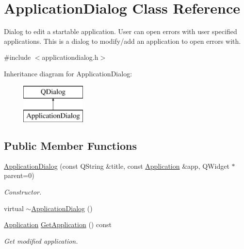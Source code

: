 \hypertarget{class_application_dialog}{\section{Application\-Dialog Class Reference}
\label{class_application_dialog}
}


Dialog to edit a startable application. User can open errors with user specified applications. This is a dialog to modify/add an application to open errors with.  




{\ttfamily \#include $<$applicationdialog.\-h$>$}

Inheritance diagram for Application\-Dialog\-:\begin{figure}[H]
\begin{center}
\leavevmode
\includegraphics[height=2.000000cm]{class_application_dialog}
\end{center}
\end{figure}
\subsection*{Public Member Functions}
\begin{DoxyCompactItemize}
\item 
\hyperlink{class_application_dialog_acf0a98d735a5b0f9b6bf5785b55d882c}{Application\-Dialog} (const Q\-String \&title, const \hyperlink{class_application}{Application} \&app, Q\-Widget $\ast$parent=0)
\begin{DoxyCompactList}\small\item\em Constructor. \end{DoxyCompactList}\item 
virtual \hyperlink{class_application_dialog_a75452cc73cc860904d7669e8bbab521c}{$\sim$\-Application\-Dialog} ()
\item 
\hyperlink{class_application}{Application} \hyperlink{class_application_dialog_aafb8f8e5f4b4c8489e7eb3633757270f}{Get\-Application} () const 
\begin{DoxyCompactList}\small\item\em Get modified application. \end{DoxyCompactList}\end{DoxyCompactItemize}
